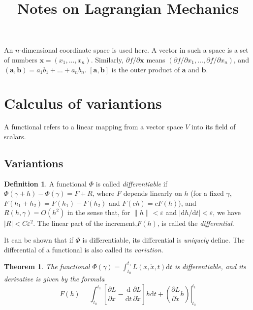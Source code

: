 \documentclass[conference]{IEEEtran}
\newtheorem{theorem}{Theorem}[section]
\theoremstyle{definition}
\newtheorem{definition}{Definition}[section]
\theoremstyle{remark}
\begin{document}
    

    \title{Notes on Lagrangian Mechanics}

    \author{}

    \maketitle

    \thispagestyle{plain}
    \pagestyle{plain}

    An $n$-dimensional coordinate space is used here. A vector in such a space is a set of numbers $\mathbf{x}=(x_1,\dots,x_n)$. Similarly, $\partial f/\partial \mathbf{x}$ means $(\partial f/\partial x_1, \dots, \partial f/\partial x_n)$, and $(\mathbf{a}, \mathbf{b}) = a_1b_1 + \dots + a_nb_n$. $[\mathbf{a}, \mathbf{b}]$ is the outer product of $\mathbf{a}$ and $\mathbf{b}$.

    \section{Calculus of variantions}

    A functional refers to a linear mapping from a vector space $V$ into its field of scalars.

    \subsection{Variantions}
    \begin{definition}
        A functional $\Phi$ is called \emph{differentiable} if $\Phi(\gamma+h) - \Phi(\gamma) = F + R$, where $F$ depends linearly on $h$ (for a fixed $\gamma$, $F(h_1+h_2) = F(h_1) + F(h_2)$ and $F(ch) = cF(h)$), and $R(h, \gamma) = O(h^2)$ in the sense that, for $\| h \| < \varepsilon$ and $| \mathrm{d} h / \mathrm{d} t | < \varepsilon$, we have $| R | < C\varepsilon^2$. The linear part of the increment,$F(h)$, is called the \emph{differential}.
    \end{definition}

    It can be shown that if $\Phi$ is differentiable, its differential is \emph{uniquely} define. The differential of a functional is also called its \emph{variation}.

    \begin{theorem}
        The functional $\Phi(\gamma) = \int_{t_0}^{t_1} L(x, \dot{x}, t) \mathrm{d} t$ is differentiable, and its derivative is given by the formula
        \begin{equation*}
            F(h) = \int_{t_0}^{t_1} \left[ \dfrac{\partial L}{\partial x} - \dfrac{\mathrm{d}}{\mathrm{d} t} \dfrac{\partial L}{\partial \dot{x}} \right] h \mathrm{d} t + \left. \left( \dfrac{\partial L}{\partial \dot{x}} h \right) \right|_{t_0}^{t_1}
        \end{equation*}
    \end{theorem}
\end{document}
